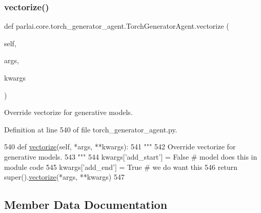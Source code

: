 \subsubsection{\texorpdfstring{vectorize()}{vectorize()}}
{\footnotesize\ttfamily def parlai.\+core.\+torch\+\_\+generator\+\_\+agent.\+Torch\+Generator\+Agent.\+vectorize (\begin{DoxyParamCaption}\item[{}]{self,  }\item[{}]{args,  }\item[{}]{kwargs }\end{DoxyParamCaption})}

\begin{DoxyVerb}Override vectorize for generative models.
\end{DoxyVerb}
 

Definition at line 540 of file torch\+\_\+generator\+\_\+agent.\+py.


\begin{DoxyCode}
540     \textcolor{keyword}{def }\hyperlink{namespaceparlai_1_1agents_1_1drqa_1_1utils_a5c76cc39e3014c7bcf9199d566dbdc0f}{vectorize}(self, *args, **kwargs):
541         \textcolor{stringliteral}{"""}
542 \textcolor{stringliteral}{        Override vectorize for generative models.}
543 \textcolor{stringliteral}{        """}
544         kwargs[\textcolor{stringliteral}{'add\_start'}] = \textcolor{keyword}{False}  \textcolor{comment}{# model does this in module code}
545         kwargs[\textcolor{stringliteral}{'add\_end'}] = \textcolor{keyword}{True}  \textcolor{comment}{# we do want this}
546         \textcolor{keywordflow}{return} super().\hyperlink{namespaceparlai_1_1agents_1_1drqa_1_1utils_a5c76cc39e3014c7bcf9199d566dbdc0f}{vectorize}(*args, **kwargs)
547 
\end{DoxyCode}


\subsection{Member Data Documentation}
\mbox{\label{classparlai_1_1core_1_1torch__generator__agent_1_1TorchGeneratorAgent_a64484ea8971fc2a665e99f99a60f0653}} 
